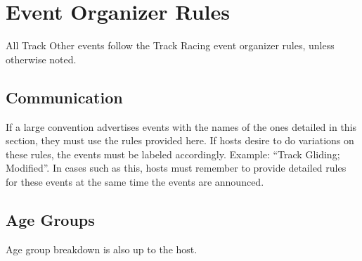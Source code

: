 \chapter{Event Organizer Rules}

All Track Other events follow the Track Racing event organizer rules, unless otherwise noted.

\section{Communication}

If a large convention advertises events with the names of the ones detailed in this section, they must use the rules provided here.
If hosts desire to do variations on these rules, the events must be labeled accordingly.
Example: ``Track Gliding; Modified''.
In cases such as this, hosts must remember to provide detailed rules for these events at the same time the events are announced.

\section{Age Groups}

Age group breakdown is also up to the host.

